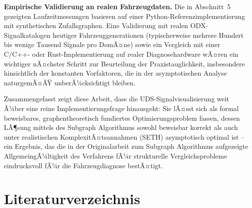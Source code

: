 ﻿\documentclass[a4paper,12pt]{article}
\theoremstyle{definition}
\begin{document}
\textbf{Empirische Validierung an realen Fahrzeugdaten.} Die in Abschnitt~5 gezeigten Laufzeitmessungen basieren auf einer Python-Referenzimplementierung mit synthetischen Zufallsgraphen. Eine Validierung mit realen ODX-Signalkatalogen heutiger Fahrzeuggenerationen (typischerweise mehrere Hundert bis wenige Tausend Signale pro DomÃ¤ne) sowie ein Vergleich mit einer C/C++- oder Rust-Implementierung auf realer Diagnosehardware wÃ¤ren ein wichtiger nÃ¤chster Schritt zur Beurteilung der Praxistauglichkeit, insbesondere hinsichtlich der konstanten Vorfaktoren, die in der asymptotischen Analyse naturgemÃ¤ÃŸ unberÃ¼cksichtigt bleiben.

Zusammengefasst zeigt diese Arbeit, dass die UDS-Signalvisualisierung weit Ã¼ber eine reine Implementierungsfrage hinausgeht: Sie lÃ¤sst sich als formal beweisbares, graphentheoretisch fundiertes Optimierungsproblem fassen, dessen LÃ¶sung mittels des Subgraph Algorithmus sowohl beweisbar korrekt als auch unter realistischen KomplexitÃ¤tsannahmen (SETH) asymptotisch optimal ist -- ein Ergebnis, das die in der Originalarbeit zum Subgraph Algorithmus aufgezeigte AllgemeingÃ¼ltigkeit des Verfahrens fÃ¼r strukturelle Vergleichsprobleme eindrucksvoll fÃ¼r die Fahrzeugdiagnose bestÃ¤tigt.

\section*{Literaturverzeichnis}
\end{document}
